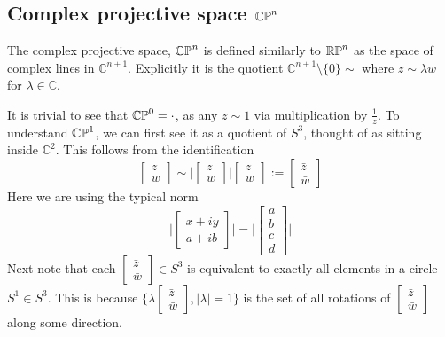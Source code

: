 \subsection{Complex projective space $\mathbb{CP}^{n}$}
The complex projective space, $\mathbb{CP}^{n}$ is defined similarly to $\mathbb{RP}^{n}$ as the space of complex lines in $\mathbb{C}^{n+1}$. Explicitly it is the quotient $\mathbb{C}^{n+1}\setminus \{0\}  \sim$ where $z\sim \lambda w$ for $\lambda \in \mathbb{C}$.

It is trivial to see that $\mathbb{CP}^{0}=\cdot$, as any $z\sim 1$ via multiplication by $\frac{1}{z}$. To understand $\mathbb{CP}^{1}$, we can first see it as a quotient of $S^3$, thought of as sitting inside $\mathbb{C}^2$. This follows from the identification $$
\begin{bmatrix} z\\ w \end{bmatrix}\sim \big|\begin{bmatrix} z\\ w \end{bmatrix}\big| \begin{bmatrix} z\\ w \end{bmatrix}:=\begin{bmatrix} \bar{z}\\ \bar{w} \end{bmatrix}$$
Here we are using the typical norm $$\big|\begin{bmatrix} x+iy\\ a+ib \end{bmatrix}\big|=\big| \begin{bmatrix} a\\ b\\ c\\ d \end{bmatrix}\big|$$
Next note that each $\begin{bmatrix} \bar{z}\\ \bar{w} \end{bmatrix}\in S^3$ is equivalent to exactly all elements in a circle $S^1\in S^3$. This is because $\{\lambda \begin{bmatrix} \bar{z}\\ \bar{w} \end{bmatrix}, |\lambda|=1\}$ is the set of all rotations of  $\begin{bmatrix} \bar{z}\\ \bar{w} \end{bmatrix}$ along some direction.

